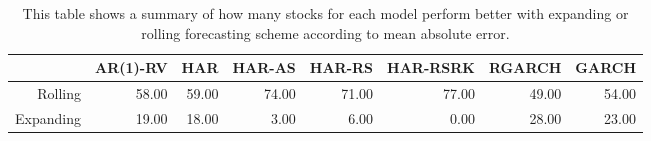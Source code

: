 \begin{table}[ht]
\centering
\begin{tabular}{rrrrrrrr}
  \hline
 & AR(1)-RV & HAR & HAR-AS & HAR-RS & HAR-RSRK & RGARCH & GARCH \\ 
  \hline
Rolling & 58.00 & 59.00 & 74.00 & 71.00 & 77.00 & 49.00 & 54.00 \\ 
  Expanding & 19.00 & 18.00 & 3.00 & 6.00 & 0.00 & 28.00 & 23.00 \\ 
   \hline
\end{tabular}
\caption[Better scheme MAE summary]{This table shows a summary of how many stocks for each model perform better with expanding or rolling forecasting scheme according to mean absolute error. } 
\label{Table:Better_MAE_summary}
\end{table}
